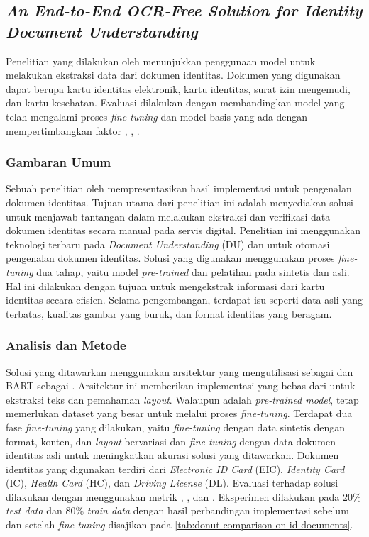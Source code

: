 \subsection{\textit{An End-to-End OCR-Free Solution for Identity Document \linebreak Understanding}}
\label{sec:penelitian-2}
Penelitian yang dilakukan oleh   menunjukkan penggunaan model \donut{} untuk melakukan ekstraksi data dari dokumen identitas. Dokumen yang digunakan dapat berupa kartu identitas elektronik, kartu identitas, surat izin 
mengemudi, dan kartu kesehatan. Evaluasi dilakukan dengan membandingkan model yang telah mengalami proses \textit{fine-tuning} dan model basis yang ada dengan mempertimbangkan faktor \fscore, \mcerfull, \tedfull. 

\subsubsection{Gambaran Umum}
Sebuah penelitian oleh  mempresentasikan hasil implementasi \donut{} untuk pengenalan dokumen identitas. Tujuan utama dari penelitian ini adalah menyediakan solusi untuk menjawab tantangan dalam melakukan ekstraksi dan verifikasi data dokumen identitas secara manual pada servis digital. Penelitian ini menggunakan teknologi terbaru pada \textit{Document Understanding} (DU) dan \ml{} untuk otomasi pengenalan dokumen identitas. Solusi yang digunakan menggunakan proses \textit{fine-tuning} dua tahap, yaitu model \textit{pre-trained} dan pelatihan pada \dataset{} sintetis dan asli. Hal ini dilakukan dengan tujuan untuk mengekstrak informasi dari kartu identitas secara efisien. Selama pengembangan, terdapat isu seperti data asli yang terbatas, kualitas gambar yang buruk, dan format identitas yang beragam. 

\subsubsection{Analisis dan Metode}
Solusi yang ditawarkan menggunakan arsitektur \transformer{} \donut{} yang mengutilisasi \swin{} sebagai \encoder{} dan BART sebagai \decoder{}. Arsitektur ini memberikan implementasi yang bebas dari \ocr{} untuk ekstraksi teks dan pemahaman \emph{layout}. Walaupun \donut{} adalah \textit{pre-trained model}, \donut{} tetap memerlukan dataset yang besar untuk melalui proses \emph{fine-tuning}. Terdapat dua fase \emph{fine-tuning} yang dilakukan, yaitu \emph{fine-tuning} dengan data sintetis dengan format, konten, dan \emph{layout} bervariasi dan \emph{fine-tuning} dengan data dokumen identitas asli untuk meningkatkan akurasi solusi yang ditawarkan. Dokumen identitas yang digunakan terdiri dari \emph{Electronic ID Card} (EIC), \emph{Identity Card} (IC), \emph{Health Card} (HC), dan \emph{Driving License} (DL). Evaluasi terhadap solusi dilakukan dengan menggunakan metrik \fscore, \mcerfull, dan \tedfull. Eksperimen dilakukan pada 20\% \emph{test data} dan 80\% \emph{train data} dengan hasil perbandingan implementasi \donut{} sebelum dan setelah \textit{fine-tuning} disajikan pada \autoref{tab:donut-comparison-on-id-documents}. 

